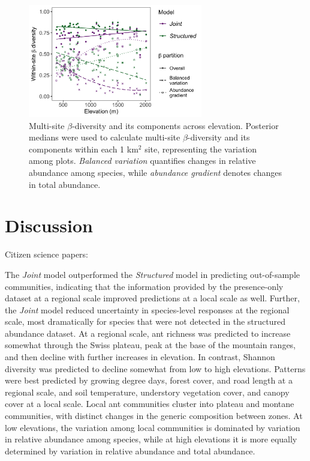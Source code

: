 \documentclass[preprint,final,times,12pt,3p]{elsarticle}
\begin{document}
\begin{figure}
\centering\includegraphics[width=3in]{../../../ms/1_Ecography/1/figs/beta_diversity.png}
\caption{\label{fig:beta_div} Multi-site $\beta$-diversity and its components across elevation. Posterior medians were used to calculate multi-site $\beta$-diversity and its components within each 1 km$^2$ site, representing the variation among plots. \emph{Balanced variation} quantifies changes in relative abundance among species, while \emph{abundance gradient} denotes changes in total abundance.}
\end{figure}


 




\section{Discussion}
\label{S:4}
Citizen science papers: \citep{Altwegg2019, Pernat2020, Henckel2020, Duan2020, Johnston2020,Robinson2020, Beck2010, Poisson2020}

The \emph{Joint} model outperformed the \emph{Structured} model in predicting out-of-sample communities, indicating that the information provided by the presence-only dataset at a regional scale improved predictions at a local scale as well. Further, the \emph{Joint} model reduced uncertainty in species-level responses at the regional scale, most dramatically for species that were not detected in the structured abundance dataset. At a regional scale, ant richness was predicted to increase somewhat through the Swiss plateau, peak at the base of the mountain ranges, and then decline with further increases in elevation. In contrast, Shannon diversity was predicted to decline somewhat from low to high elevations. Patterns were best predicted by growing degree days, forest cover, and road length at a regional scale, and soil temperature, understory vegetation cover, and canopy cover at a local scale. Local ant communities cluster into plateau and montane communities, with distinct changes in the generic composition between zones. At low elevations, the variation among local communities is dominated by variation in relative abundance among species, while at high elevations it is more equally determined by variation in relative abundance and total abundance.
\end{document}
